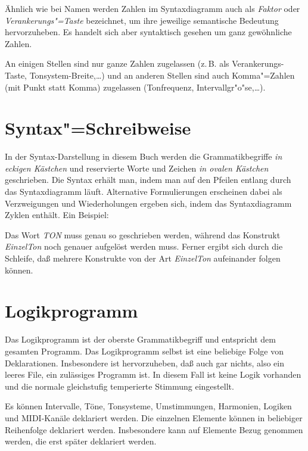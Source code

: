 Ähnlich wie bei Namen werden Zahlen im Syntaxdiagramm auch als \emph{Faktor}
oder \emph{Verankerungs"=Taste} bezeichnet,
um ihre jeweilige semantische Bedeutung
hervorzuheben. Es handelt sich aber syntaktisch gesehen um ganz gewöhnliche
Zahlen.

An einigen Stellen sind nur ganze Zahlen zugelassen (z.\,B. als
Verankerungs-Taste, Tonsystem-Breite,\ldots) und an anderen Stellen
sind auch Komma"=Zahlen (mit Punkt statt Komma) zugelassen (Tonfrequenz,
In\-ter\-vall\-gr"o"se,\ldots).



\chapter{Syntax"=Schreibweise}\label{cha:syntax-schreibweise}
\label{drei}

In der Syntax-Darstellung in diesem Buch werden die Grammatikbegriffe
\emph{in eckigen Kästchen} und reservierte Worte und Zeichen \emph{in
ovalen Kästchen} geschrieben. Die Syntax erhält man, indem man auf den
Pfeilen entlang durch das Syntaxdiagramm läuft.
Alternative Formulierungen erscheinen dabei als Verzweigungen
und Wiederholungen ergeben sich, indem das Syntaxdiagramm Zyklen enthält.
Ein Beispiel:



Das Wort \emph{TON} muss genau so geschrieben werden, während das Konstrukt
\emph{EinzelTon} noch genauer aufgelöst werden muss. Ferner ergibt sich durch
die Schleife, daß mehrere Konstrukte von der Art \emph{EinzelTon}
aufeinander folgen können.


\chapter{ Logikprogramm}\label{cha:das-logikprogramm}
Das Logikprogramm ist der oberste Grammatikbegriff und entspricht
dem gesamten Programm. Das Logikprogramm selbst ist eine beliebige
Folge von Deklarationen.
Insbesondere ist hervorzuheben, daß auch
gar nichts, also ein leeres File, ein zulässiges Programm ist.
In diesem Fall ist keine Logik vorhanden und die normale
gleichstufig temperierte Stimmung eingestellt.

Es können Intervalle, Töne, Tonsysteme, Umstimmungen, Harmonien,
Logiken und MIDI-Kanäle deklariert werden. Die einzelnen Elemente können
in beliebiger Reihenfolge deklariert werden. Insbesondere kann auf
Elemente Bezug genommen werden, die erst später deklariert werden.

